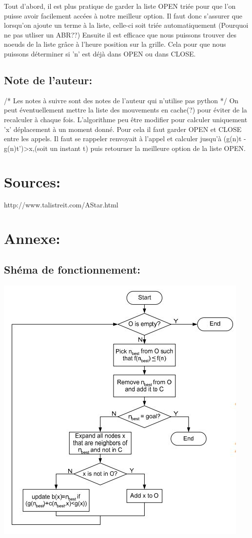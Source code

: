 \documentclass{article}
\begin{document}
Tout d'abord, il est plus pratique de garder la liste OPEN triée pour que l'on puisse avoir facilement accées à notre meilleur option. Il faut donc s'assurer que lorsqu'on ajoute un terme à la liste, celle-ci soit triée automatiquement (Pourquoi ne pas utliser un ABR??) \newline
Ensuite il est efficace que nous puissons trouver des noeuds de la liste grâce à l'heure position sur la grille. Cela pour que nous puissons déterminer si 'n' est déjà dans OPEN ou dans CLOSE.


\subsection{Note de l'auteur:}
/* Les notes à suivre sont des notes de l'auteur qui n'utilise pas python */ \newline
On peut éventuellement mettre la liste des mouvements en cache(?) pour éviter de la recalculer à chaque fois. \newline
L'algorithme peu être modifier pour calculer uniquement 'x' déplacement à un moment donné. Pour cela il faut garder OPEN et CLOSE entre les appels. Il faut se rappeler renvoyait à l'appel et calculer jusqu'à (g(n)t - g(n)t')>x,(soit un instant t) puis retourner la meilleure option de la liste OPEN.
\section{Sources:}
http://www.talistreit.com/AStar.html
\newpage
\section{Annexe:}
\subsection{Shéma de fonctionnement:}
\includegraphics[scale=1]{images/shema.png}
\end{document}
